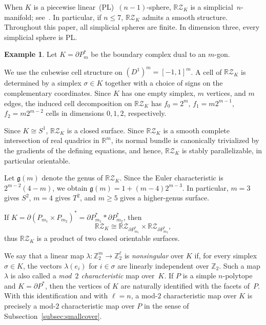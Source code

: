 \documentclass{amsart}
\numberwithin{equation}{section}
\theoremstyle{definition}
\newtheorem{example}[theorem]{Example}
\theoremstyle{remark}
\newcommand{\Z}{\mathbb Z}
\newcommand{\R}{\mathbb R}
\newcommand{\RZ}{\mathbb R\mathcal Z}
\def\genus{\mathfrak g}
\DeclareMathOperator{\join}{\ast}
\begin{document}
When $K$ is a piecewise linear~(PL)~$(n-1)$-sphere, $\RZ_K$ is a simplicial~$n$-manifold; see~\cite[Theorem~2.3]{Cai2017}.
In particular, if $n \leq 7$, $\RZ_K$ admits a smooth structure.
Throughout this paper, all simplicial spheres are finite.
In dimension three, every simplicial sphere is PL.

\begin{example} \label{ex:RZ_polygon}
    Let $K=\partial P_m^\ast$ be the boundary complex dual to an $m$-gon.
        
    We use the cubewise cell structure on $(D^1)^m=[-1,1]^m$.
    A cell of $\RZ_{K}$ is determined by a simplex $\sigma\in K$ together with a choice of signs on the complementary coordinates.
    Since $K$ has one empty simplex, $m$ vertices, and $m$ edges, the induced cell decomposition on $\RZ_{K}$ has $f_0=2^m$, $f_1=m2^{m-1}$, $f_2=m2^{m-2}$ cells in dimensions $0,1,2$, respectively.

    Since $K \cong S^1$, $\RZ_K$ is a closed surface.
    Since $\RZ_K$ is a smooth complete intersection of real quadrics in $\R^m$, its normal bundle is canonically trivialized by the gradients of the defining equations, and hence, $\RZ_K$ is stably parallelizable, in particular orientable.
     
    Let $\genus(m)$ denote the genus of $\RZ_K$.
    Since the Euler characteristic is $2^{m-2}(4 - m)$, we obtain $\genus(m) = 1 + (m-4) 2^{m-3}$.
    In particular, $m=3$ gives $S^2$, $m=4$ gives $T^2$, and $m\ge 5$ gives a higher-genus surface.

    If $K=\partial (P_{m_1} \times P_{m_2})^\ast = \partial P_{m_1}^\ast \join \partial P_{m_2}^\ast$, then
    $$
        \RZ_K \cong \RZ_{\partial P_{m_1}^\ast}\times \RZ_{ \partial P_{m_2}^\ast},
    $$
    thus $\RZ_K$ is a product of two closed orientable surfaces.
\end{example}

We say that a linear map $\lambda \colon \Z_2^m\to \Z_2^\ell$ is \emph{nonsingular} over $K$ if, for every simplex~$\sigma\in K$, the vectors $\lambda(e_i)$ for $i\in \sigma$ are linearly independent over $\Z_2$.
Such a map $\lambda$ is also called a \emph{mod~$2$ characteristic} map over~$K$.
If $P$ is a simple $n$-polytope and $K=\partial P^\ast$, then the vertices of $K$ are naturally identified with the facets of~$P$.
With this identification and with $\ell=n$, a mod-$2$ characteristic map over $K$ is precisely a mod-$2$ characteristic map over $P$ in the sense of Subsection~\ref{subsec:smallcover}.
\end{document}

